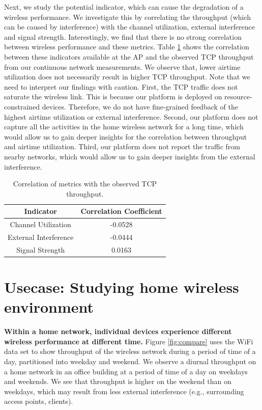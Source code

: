 Next, we study the potential indicator, which can cause the degradation of a wireless performance. We investigate this by correlating the throughput (which can be caused by interference) with the channel utilization, external interference and signal strength. Interestingly, we find that there is no strong correlation between wireless performance and these metrics. Table \ref{table: Correlation} shows the correlation between these indicators available at the AP and the observed TCP throughput from our continuous network measurements. We observe that, lower airtime utilization does not necessarily result in higher TCP throughput. Note that we need to interpret our findings with caution. First, the TCP traffic does not saturate the wireless link. This is because our platform is deployed on resource-constrained devices. Therefore, we do not have fine-grained feedback of the highest airtime utilization or external interference. Second, our platform does not capture all the activities in the home wireless network for a long time, which would allow us to gain deeper insights for the correlation between throughput and airtime utilization. Third, our platform does not report the traffic from nearby networks, which would allow us to gain deeper insights from the external interference.

\begin{table}[]
\centering
\begin{tabular}{ |c|c| }
\hline
Indicator               & Correlation Coefficient  \\ 
\hline
Channel Utilization               &-0.0528  \\ 
\hline
External Interference & -0.0444 \\ 
\hline
Signal Strength & 0.0163 \\
\hline
\end{tabular}
\caption{Correlation of metrics with the observed TCP throughput.}
\label{table: Correlation}
\end{table}

\section{Usecase: Studying home wireless environment}
\label{sec.usecase3}

\textbf{Within a home network, individual devices experience different wireless performance at different time.} Figure \ref{fig:compare} uses the WiFi data set to show throughput of the wireless network during a period of time of a day, partitioned into weekday and weekend. We observe a diurnal throughput on a home network in an office building at a period of time of a day on weekdays and weekends. We see that throughput is higher on the weekend than on weekdays, which may result from less external interference (e.g., surrounding access points, clients).


